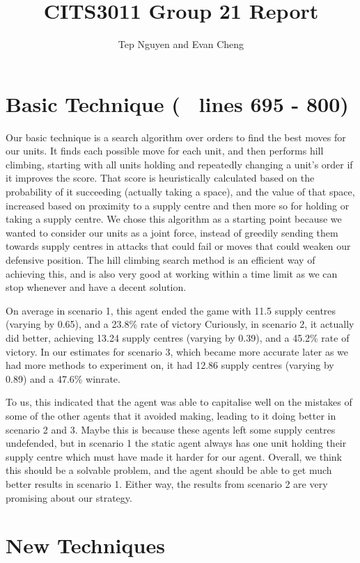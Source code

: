 \documentclass[12pt,a4paper]{article}
\title{CITS3011 Group 21 Report}
\author{Tep Nguyen and Evan Cheng}
\begin{document}
 
\maketitle                         

\section{Basic Technique (~ lines 695 - 800)}
Our basic technique is a search algorithm over orders to find the best moves for our units. It finds each possible move for each unit, and then performs hill climbing, starting with all units holding 
and repeatedly changing a unit's order if it improves the score.
That score is heuristically calculated based on the probability of it succeeding (actually taking a space), and the value of that space, increased based on proximity to a supply centre and then more so for holding or taking a supply centre.
We chose this algorithm as a starting point because we wanted to consider our units as a joint force, instead of greedily sending them towards supply centres in attacks that could fail or moves that could weaken our defensive position. 
The hill climbing search method is an efficient way of achieving this, and is also very good at working within a time limit as we can stop whenever and have a decent solution.

On average in scenario 1, this agent ended the game with 11.5 supply centres (varying by 0.65), and a 23.8\% rate of victory 
Curiously, in scenario 2, it actually did better, achieving 13.24 supply centres (varying by 0.39), and a 45.2\% rate of victory.
In our estimates for scenario 3, which became more accurate later as we had more methods to experiment on, it had 12.86 supply centres (varying by 0.89) and a 47.6\% winrate.

To us, this indicated that the agent was able to capitalise well on the mistakes of some of the other agents that it avoided making, leading to it doing better in scenario 2 and 3. 
Maybe this is because these agents left some supply centres undefended, but in scenario 1 the static agent always has one unit holding their supply centre which must have made it harder for our agent. 
Overall, we think this should be a solvable problem, and the agent should be able to get much better results in scenario 1. Either way, the results from scenario 2 are very promising about our strategy.

\section{New Techniques}
\end{document}
